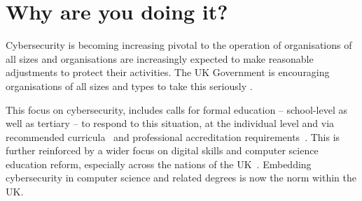 \documentclass[sigconf]{acmart}
\begin{document}
\section {Why are you doing it?}	
\begin{comment}
\begin{quote}
	``{\emph{...[need to] change the culture in your organisation around cyber security; to try to do for cyber what has been done so successfully for health and safety, for example, over the last ten years --- to get everybody to take it seriously; to take the risk management process seriously and drive that down through the organisation.}}''\\
	\hfill Robert Hannigan~\cite{Hannigan2019a}, former Director of GCHQ
\end{quote}
\end{comment}
Cybersecurity is becoming increasing pivotal to the operation of organisations of all sizes and organisations are increasingly expected to make reasonable adjustments to protect their activities. The UK Government is encouraging organisations of all sizes and types to take this seriously \cite{Hannigan2019a}. 

\begin{comment}

This need to build knowledge, skills and capacity in the area of cybersecurity has also led to the establishment of a number of strategic policy initiatives from a number of national governments, for example the publication in 2016 of the UK's Cyber Security Strategy~\cite{ukcyberstrategy:2016} (along with the setting up of the National Cyber Security Centre, as well as increased scrutiny of the resilience of the UK's critical national infrastructure~\cite{lordscyberreport:2018}; also industry-focused initiatives such as Cyber Essentials~\cite{ncsc2017ce}, the EU Cybersecurity Act~\cite{eucyber2018} (which reinforces the mandate of the EU Agency for Cybersecurity: ENISA, the European Union Agency for Network and Information and Security), or the National Initiative for Cybersecurity Education (NICE) in the USA~\cite{NICE}.

\end{comment}

This focus on cybersecurity, includes calls for formal education -- school-level as well as tertiary -- to respond to this situation, at the individual level and via recommended curricula~\cite{mcgettrick-et-al:sigcse2014,ACM2017b} and professional accreditation requirements~\cite{BCS2018a,NCSC2017}. This is further reinforced by a wider focus on digital skills and computer science education reform, especially across the nations of the UK~\cite{brown-et-al:toce2014,murphy-et-al:programming2017,tryfonas+crick:petra2018}. Embedding cybersecurity in computer science and related degrees is now the norm within the UK. %
\end{document}
